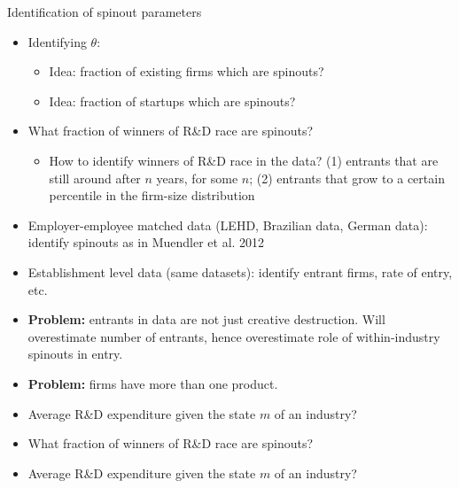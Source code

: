 \documentclass[english,usenames,dvipsnames]{beamer}
\begin{document}
\begin{frame}{Identification of spinout parameters}
\begin{itemize}
	\item Identifying $\theta$:
	\begin{itemize}
		\item Idea: fraction of existing firms which are spinouts? 
		\item Idea: fraction of startups which are spinouts?
	\end{itemize}
	\item What fraction of winners of R\&D race are spinouts?
	\begin{itemize}
		\item How to identify winners of R\&D race in the data? (1) entrants that are still around after $n$ years, for some $n$; (2) entrants that grow to a certain percentile in the firm-size distribution  
	\end{itemize}

	\item Employer-employee matched data (LEHD, Brazilian data, German data): identify spinouts as in Muendler et al. 2012
	\item Establishment level data (same datasets): identify entrant firms, rate of entry, etc.
	\item \textbf{Problem:} entrants in data are not just creative destruction. Will overestimate number of entrants, hence overestimate role of within-industry spinouts in entry. 
	\item \textbf{Problem:} firms have more than one product.
	\item Average R\&D expenditure given the state $m$ of an industry?

	\item What fraction of winners of R\&D race are spinouts?

	\item Average R\&D expenditure given the state $m$ of an industry? 
\end{itemize}
\end{frame}
\end{document}
